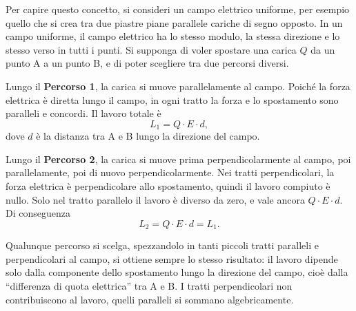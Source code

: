 Per capire questo concetto, si consideri un campo elettrico uniforme, per esempio quello che si crea tra due piastre piane parallele cariche di segno opposto. In un campo uniforme, il campo elettrico ha lo stesso modulo, la stessa direzione e lo stesso verso in tutti i punti. Si supponga di voler spostare una carica \(Q\) da un punto A a un punto B, e di poter scegliere tra due percorsi diversi.

\begin{figure}[htbp]
\centering
{}
\end{figure}

Lungo il \textbf{Percorso 1}, la carica si muove parallelamente al campo. Poiché la forza elettrica è diretta lungo il campo, in ogni tratto la forza e lo spostamento sono paralleli e concordi. Il lavoro totale è
\[
L_1 = Q \cdot E \cdot d,
\]
dove \(d\) è la distanza tra A e B lungo la direzione del campo.

Lungo il \textbf{Percorso 2}, la carica si muove prima perpendicolarmente al campo, poi parallelamente, poi di nuovo perpendicolarmente. Nei tratti perpendicolari, la forza elettrica è perpendicolare allo spostamento, quindi il lavoro compiuto è nullo. Solo nel tratto parallelo il lavoro è diverso da zero, e vale ancora \(Q \cdot E \cdot d\). Di conseguenza
\[
L_2 = Q \cdot E \cdot d = L_1.
\]

Qualunque percorso si scelga, spezzandolo in tanti piccoli tratti paralleli e perpendicolari al campo, si ottiene sempre lo stesso risultato: il lavoro dipende solo dalla componente dello spostamento lungo la direzione del campo, cioè dalla ``differenza di quota elettrica'' tra A e B. I tratti perpendicolari non contribuiscono al lavoro, quelli paralleli si sommano algebricamente.

